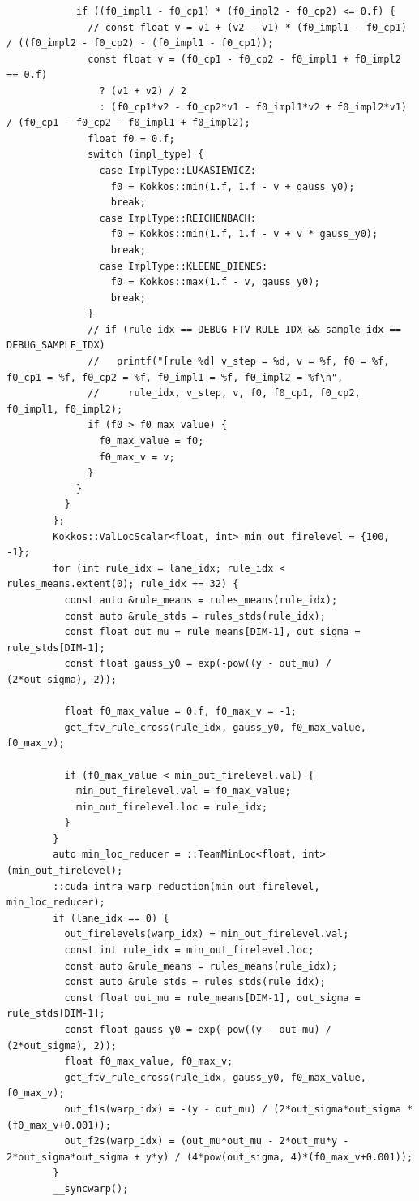 \begin{verbatim}
            if ((f0_impl1 - f0_cp1) * (f0_impl2 - f0_cp2) <= 0.f) {
              // const float v = v1 + (v2 - v1) * (f0_impl1 - f0_cp1) / ((f0_impl2 - f0_cp2) - (f0_impl1 - f0_cp1));
              const float v = (f0_cp1 - f0_cp2 - f0_impl1 + f0_impl2 == 0.f)
                ? (v1 + v2) / 2
                : (f0_cp1*v2 - f0_cp2*v1 - f0_impl1*v2 + f0_impl2*v1) / (f0_cp1 - f0_cp2 - f0_impl1 + f0_impl2);
              float f0 = 0.f;
              switch (impl_type) {
                case ImplType::LUKASIEWICZ:
                  f0 = Kokkos::min(1.f, 1.f - v + gauss_y0);
                  break;
                case ImplType::REICHENBACH:
                  f0 = Kokkos::min(1.f, 1.f - v + v * gauss_y0);
                  break;
                case ImplType::KLEENE_DIENES:
                  f0 = Kokkos::max(1.f - v, gauss_y0);
                  break;
              }
              // if (rule_idx == DEBUG_FTV_RULE_IDX && sample_idx == DEBUG_SAMPLE_IDX)
              //   printf("[rule %d] v_step = %d, v = %f, f0 = %f, f0_cp1 = %f, f0_cp2 = %f, f0_impl1 = %f, f0_impl2 = %f\n",
              //     rule_idx, v_step, v, f0, f0_cp1, f0_cp2, f0_impl1, f0_impl2);
              if (f0 > f0_max_value) {
                f0_max_value = f0;
                f0_max_v = v;
              }
            }
          }
        };
        Kokkos::ValLocScalar<float, int> min_out_firelevel = {100, -1};
        for (int rule_idx = lane_idx; rule_idx < rules_means.extent(0); rule_idx += 32) {
          const auto &rule_means = rules_means(rule_idx);
          const auto &rule_stds = rules_stds(rule_idx);
          const float out_mu = rule_means[DIM-1], out_sigma = rule_stds[DIM-1];
          const float gauss_y0 = exp(-pow((y - out_mu) / (2*out_sigma), 2));

          float f0_max_value = 0.f, f0_max_v = -1;
          get_ftv_rule_cross(rule_idx, gauss_y0, f0_max_value, f0_max_v);

          if (f0_max_value < min_out_firelevel.val) {
            min_out_firelevel.val = f0_max_value;
            min_out_firelevel.loc = rule_idx;
          }
        }
        auto min_loc_reducer = ::TeamMinLoc<float, int>(min_out_firelevel);
        ::cuda_intra_warp_reduction(min_out_firelevel, min_loc_reducer);
        if (lane_idx == 0) {
          out_firelevels(warp_idx) = min_out_firelevel.val;
          const int rule_idx = min_out_firelevel.loc;
          const auto &rule_means = rules_means(rule_idx);
          const auto &rule_stds = rules_stds(rule_idx);
          const float out_mu = rule_means[DIM-1], out_sigma = rule_stds[DIM-1];
          const float gauss_y0 = exp(-pow((y - out_mu) / (2*out_sigma), 2));
          float f0_max_value, f0_max_v;
          get_ftv_rule_cross(rule_idx, gauss_y0, f0_max_value, f0_max_v);
          out_f1s(warp_idx) = -(y - out_mu) / (2*out_sigma*out_sigma * (f0_max_v+0.001));
          out_f2s(warp_idx) = (out_mu*out_mu - 2*out_mu*y - 2*out_sigma*out_sigma + y*y) / (4*pow(out_sigma, 4)*(f0_max_v+0.001));
        }
        __syncwarp();


\end{verbatim}
